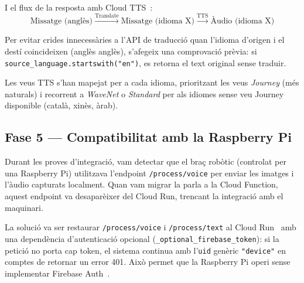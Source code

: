 I el flux de la resposta amb Cloud TTS~\cite{tts}:
\[
\text{Missatge (anglès)} \xrightarrow{\text{Translate}} \text{Missatge (idioma X)} \xrightarrow{\text{TTS}} \text{Àudio (idioma X)}
\]

Per evitar crides innecessàries a l'API de traducció quan l'idioma d'origen i el destí coincideixen (anglès \arw{} anglès), s'afegeix una comprovació prèvia: si \texttt{source\_language.startswith("en")}, es retorna el text original sense traduir.

Les veus TTS s'han mapejat per a cada idioma, prioritzant les veus \textit{Journey} (més naturals) i recorrent a \textit{WaveNet} o \textit{Standard} per als idiomes sense veu Journey disponible (català, xinès, àrab).

\subsection{Fase 5 — Compatibilitat amb la Raspberry Pi}

Durant les proves d'integració, vam detectar que el braç robòtic (controlat per una Raspberry Pi) utilitzava l'endpoint \texttt{/process/voice} per enviar les imatges i l'àudio capturats localment. Quan vam migrar la parla a la Cloud Function, aquest endpoint va desaparèixer del Cloud Run, trencant la integració amb el maquinari.

La solució va ser restaurar \texttt{/process/voice} i \texttt{/process/text} al Cloud Run~\cite{cloudrun} amb una dependència d'autenticació opcional (\texttt{\_optional\_firebase\_token}): si la petició no porta cap token, el sistema continua amb l'\texttt{uid} genèric \texttt{"device"} en comptes de retornar un error 401. Això permet que la Raspberry Pi operi sense implementar Firebase Auth~\cite{firebase}.
